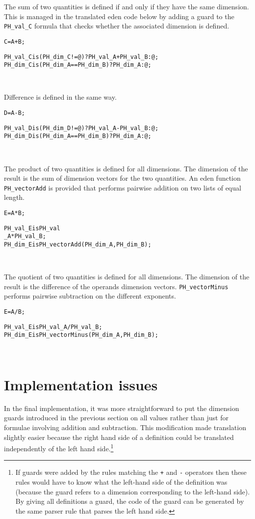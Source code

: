 \documentclass[a4paper]{article}
\newenvironment{boxcode}{\begin{lrbox}{\savepar}
	\begin{minipage}[b]{\textwidth}\begin{alltt}}
{\end{alltt}\end{minipage}\end{lrbox}\fbox{\usebox{\savepar}}\ \\}
\begin{document}
The sum of two quantities is defined if and only if they have the same 
dimension.
This is managed in the translated eden code below by adding a guard to the 
\texttt{PH\_val\_C} formula that checks whether the associated dimension is
defined.

\begin{alltt}
%physical
C=A+B;
\end{alltt}
\begin{boxcode}
PH_val_C is (PH_dim_C != @) ? PH_val_A+PH_val_B : @;
PH_dim_C is (PH_dim_A == PH_dim_B) ? PH_dim_A : @;
\end{boxcode}

Difference is defined in the same way.

\begin{alltt}
%physical
D=A-B;
\end{alltt}
\begin{boxcode}
PH_val_D is (PH_dim_D != @) ? PH_val_A-PH_val_B : @;
PH_dim_D is (PH_dim_A == PH_dim_B) ? PH_dim_A : @;
\end{boxcode}


The product of two quantities is defined for all dimensions.
The dimension of the result is the sum of dimension vectors for the two
quantities. An eden function \texttt{PH\_vectorAdd} is provided that performs 
pairwise addition on two lists of equal length.
\begin{alltt}
%physical
E=A*B;
\end{alltt}
\begin{boxcode}
PH_val_E is PH_val
_A*PH_val_B;
PH_dim_E is PH_vectorAdd(PH_dim_A,PH_dim_B);
\end{boxcode}

The quotient of two quantities is defined for all dimensions.
The dimension of the result is the difference of the operands dimension 
vectors. \texttt{PH\_vectorMinus} performs pairwise subtraction on the 
different exponents.

\begin{alltt}
%physical
E=A/B;
\end{alltt}
\begin{boxcode}
PH_val_E is PH_val_A/PH_val_B;
PH_dim_E is PH_vectorMinus(PH_dim_A,PH_dim_B);
\end{boxcode}

\section{Implementation issues}
In the final implementation, it was more straightforward to put the 
dimension guards introduced in the previous section
 on all values rather than just for formulae involving addition
and subtraction. This modification made translation slightly easier because the 
right hand side 
of a definition could be translated independently of the left hand 
side.\footnote{
If guards were added by the rules matching the \texttt{+} and \texttt{-} 
operators
then these rules would have to know what the left-hand side of the definition 
was (because the 
guard refers to a dimension corresponding to the left-hand side). By giving all 
definitions a guard,
the code of the guard can be generated by the same parser rule that parses the 
left hand side.}
\end{document}
